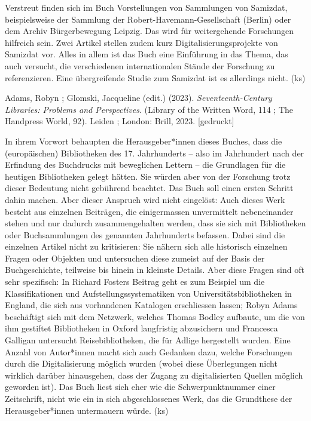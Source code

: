 \documentclass[a4paper,
fontsize=11pt,
oneside,
numbers=noperiodatend,
parskip=half-,
bibliography=totoc,
final
]{scrartcl}
\begin{document}
Verstreut finden sich im Buch Vorstellungen von Sammlungen von Samizdat,
beispielsweise der Sammlung der Robert-Havemann-Gesellschaft (Berlin)
oder dem Archiv Bürgerbewegung Leipzig. Das wird für weitergehende
Forschungen hilfreich sein. Zwei Artikel stellen zudem kurz
Digitalisierungsprojekte von Samizdat vor. Alles in allem ist das Buch
eine Einführung in das Thema, das auch versucht, die verschiedenen
internationalen Stände der Forschung zu referenzieren. Eine
übergreifende Studie zum Samizdat ist es allerdings nicht. (ks)

Adams, Robyn ; Glomski, Jacqueline (edit.) (2023).
\emph{Seventeenth-Century Libraries: Problems and Perspectives}.
(Library of the Written Word, 114 ; The Handpress World, 92). Leiden ;
London: Brill, 2023. {[}gedruckt{]}

In ihrem Vorwort behaupten die Herausgeber*innen dieses Buches, dass die
(europäischen) Bibliotheken des 17. Jahrhunderts -- also im Jahrhundert
nach der Erfindung des Buchdrucks mit beweglichen Lettern -- die
Grundlagen für die heutigen Bibliotheken gelegt hätten. Sie würden aber
von der Forschung trotz dieser Bedeutung nicht gebührend beachtet. Das
Buch soll einen ersten Schritt dahin machen. Aber dieser Anspruch wird
nicht eingelöst: Auch dieses Werk besteht aus einzelnen Beiträgen, die
einigermassen unvermittelt nebeneinander stehen und nur dadurch
zusammengehalten werden, dass sie sich mit Bibliotheken oder
Buchsammlungen des genannten Jahrhunderts befassen. Dabei sind die
einzelnen Artikel nicht zu kritisieren: Sie nähern sich alle historisch
einzelnen Fragen oder Objekten und untersuchen diese zumeist auf der
Basis der Buchgeschichte, teilweise bis hinein in kleinste Details. Aber
diese Fragen sind oft sehr spezifisch: In Richard Fosters Beitrag geht
es zum Beispiel um die Klassifikationen und Aufstellungssystematiken von
Universitätsbibliotheken in England, die sich aus vorhandenen Katalogen
erschliessen lassen; Robyn Adams beschäftigt sich mit dem Netzwerk,
welches Thomas Bodley aufbaute, um die von ihm gestiftet Bibliotheken in
Oxford langfristig abzusichern und Francesca Galligan untersucht
Reisebibliotheken, die für Adlige hergestellt wurden. Eine Anzahl von
Autor*innen macht sich auch Gedanken dazu, welche Forschungen durch die
Digitalisierung möglich wurden (wobei diese Überlegungen nicht wirklich
darüber hinausgehen, dass der Zugang zu digitalisierten Quellen möglich
geworden ist). Das Buch liest sich eher wie die Schwerpunktnummer einer
Zeitschrift, nicht wie ein in sich abgeschlossenes Werk, das die
Grundthese der Herausgeber*innen untermauern würde. (ks)
\end{document}
